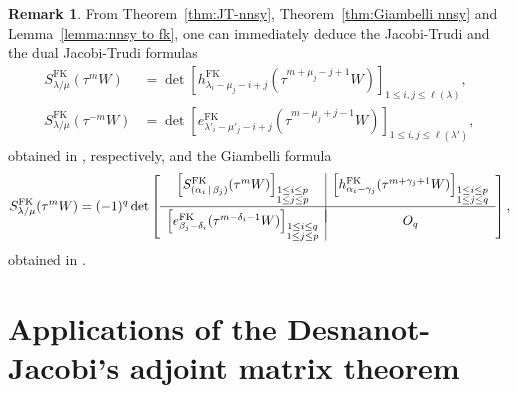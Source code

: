 \documentclass[12pt]{amsart}%
\theoremstyle{definition}
\newtheorem{remark}[theorem]{Remark}
\newcommand{\M}{\mathrm{M}}
\newcommand{\FK}{\mathrm{FK}}
\begin{document}
\begin{remark}
From 
Theorem~\ref{thm:JT-nnsy},
Theorem~\ref{thm:Giambelli nnsy}
and Lemma~\ref{lemma:nnsy to fk},
one can immediately deduce the Jacobi-Trudi and the dual Jacobi-Trudi formulas 
\begin{align*}
 S^{\FK}_{\lambda/\mu}(\tau^m W)
&=\det\left[h^{\FK}_{\lambda_i-\mu_j-i+j}(\tau^{m+\mu_j-j+1}W)\right]_{1\le i,j\le \ell(\lambda)},\\
 S^{\FK}_{\lambda/\mu}(\tau^{-m} W)
&=\det\left[e^{\FK}_{\lambda'_i-\mu'_j-i+j}(\tau^{m-\mu_j+j-1}W)\right]_{1\le i,j\le \ell(\lambda')},
\end{align*}
obtained in \cite[Corollary~5.1 and Corollary~5.2]{fk21}, respectively, and the Giambelli formula 
\begin{align*}
 S^{\FK}_{\lambda/\mu}(\tau^m W)
=(-1)^q\det\left[
\begin{array}{c|c}
\left[S^{\FK}_{(\alpha_i\,|\,\beta_j)}(\tau^m W)\right]_{\substack{1\le i\le p \\ 1\le j\le p}} & 
\left[h^{\FK}_{\alpha_i-\gamma_j}(\tau^{m+\gamma_j+1} W)\right]_{\substack{1\le i\le p \\ 1\le j\le q}} \\[10pt]
\hline \\[-10pt]
 \left[e^{\FK}_{\beta_j-\delta_i}(\tau^{m-\delta_i-1}W)\right]_{\substack{1\le i\le q \\ 1\le j\le p}} & O_{q}
\end{array}
\right],
\end{align*}
obtained in \cite[Corollary~5.3]{fk21}.
\end{remark}



\section{Applications of the Desnanot-Jacobi's adjoint matrix theorem
}
\label{djformulasection}
\end{document}
